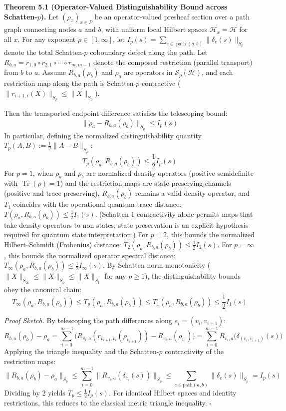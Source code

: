 \documentclass[
]{article}
\renewenvironment{quote}
  {\begin{leftbar}\small}
  {\end{leftbar}}
\begin{document}
\begin{quote}
\textbf{Theorem 5.1 (Operator-Valued Distinguishability Bound across Schatten-\(p\)).} Let \((\rho_x)_{x \in P}\) be an operator-valued presheaf section over a path graph connecting nodes \(a\) and \(b\), with uniform local Hilbert spaces \(\mathcal{H}_x = \mathcal{H}\) for all \(x\). For any exponent \(p \in [1, \infty]\), let \(I_p(s) = \sum_{e \in \operatorname{path}(a,b)} \|\delta_e(s)\|_{S_p}\) denote the total Schatten-\(p\) coboundary defect along the path. Let \(R_{b,a} = r_{1,0} \circ r_{2,1} \circ \cdots \circ r_{m,m-1}\) denote the composed restriction (parallel transport) from \(b\) to \(a\). Assume \(R_{b,a}(\rho_b)\) and \(\rho_a\) are operators in \(\mathcal{S}_p(\mathcal{H})\), and each restriction map along the path is Schatten-\(p\) contractive (\(\|r_{i+1,i}(X)\|_{S_p} \le \|X\|_{S_p}\)).

Then the transported endpoint difference satisfies the telescoping bound:
\[ \|\rho_a - R_{b,a}(\rho_b)\|_{S_p} \le I_p(s) \]
In particular, defining the normalized distinguishability quantity \(T_p(A, B) := \frac{1}{2} \|A - B\|_{S_p}\):
\[ T_p(\rho_a, R_{b,a}(\rho_b)) \le \frac{1}{2} I_p(s) \]
For \(p = 1\), when \(\rho_a\) and \(\rho_b\) are normalized density operators (positive semidefinite with \(\operatorname{Tr}(\rho)=1\)) and the restriction maps are state-preserving channels (positive and trace-preserving), \(R_{b,a}(\rho_b)\) remains a valid density operator, and \(T_1\) coincides with the operational quantum trace distance: \(T(\rho_a, R_{b,a}(\rho_b)) \le \frac{1}{2} I_1(s)\). (Schatten-1 contractivity alone permits maps that take density operators to non-states; state preservation is an explicit hypothesis required for quantum state interpretation.)
For \(p = 2\), this bounds the normalized Hilbert--Schmidt (Frobenius) distance: \(T_2(\rho_a, R_{b,a}(\rho_b)) \le \frac{1}{2} I_2(s)\).
For \(p = \infty\), this bounds the normalized operator spectral distance: \(T_\infty(\rho_a, R_{b,a}(\rho_b)) \le \frac{1}{2} I_\infty(s)\).
By Schatten norm monotonicity (\(\|X\|_{S_\infty} \le \|X\|_{S_p} \le \|X\|_{S_1}\) for any \(p \ge 1\)), the distinguishability bounds obey the canonical chain:
\[ T_\infty(\rho_a, R_{b,a}(\rho_b)) \le T_p(\rho_a, R_{b,a}(\rho_b)) \le T_1(\rho_a, R_{b,a}(\rho_b)) \le \frac{1}{2} I_1(s) \]
\end{quote}

\emph{Proof Sketch.} By telescoping the path differences along \(e_i = (v_i, v_{i+1})\):
\[ R_{b,a}(\rho_b) - \rho_a = \sum_{i=0}^{m-1} \Big( R_{v_i, a}(r_{v_{i+1}, v_i}(\rho_{v_{i+1}})) - R_{v_i, a}(\rho_{v_i}) \Big) = \sum_{i=0}^{m-1} R_{v_i, a} \Big( \delta_{(v_i, v_{i+1})}(s) \Big) \]
Applying the triangle inequality and the Schatten-\(p\) contractivity of the restriction maps:
\[ \|R_{b,a}(\rho_b) - \rho_a\|_{S_p} \le \sum_{i=0}^{m-1} \|R_{v_i, a}(\delta_{e_i}(s))\|_{S_p} \le \sum_{e \in \text{path}(a,b)} \|\delta_e(s)\|_{S_p} = I_p(s) \]
Dividing by 2 yields \(T_p \le \frac{1}{2} I_p(s)\). For identical Hilbert spaces and identity restrictions, this reduces to the classical metric triangle inequality. \(\square\)
\end{document}
